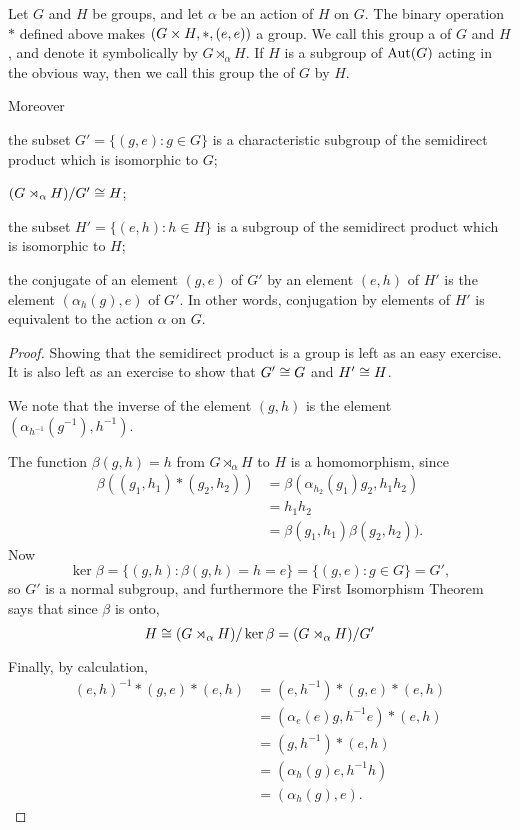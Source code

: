 \begin{proposition}
  Let $G$ and $H$ be groups, and let $\alpha$ be an action of $H$ on $G$.
  The binary operation $\ast$ defined above makes $(G \times H,
  \ast, (e,e))$ a group.  We call this group a 
  of $G$ and $H$, and denote it symbolically by $G \rtimes_{\alpha} H$.
  If $H$ is a subgroup of $\operatorname{Aut}(G)$ acting in the obvious way, then we call
  this group the  of $G$ by $H$.
  
  Moreover
  \begin{theoremenum}
    \item the subset $G' = \{(g,e): g \in G\}$ is a characteristic
    subgroup of the semidirect product which is isomorphic to $G$;
    
    \item $(G \rtimes_{\alpha} H) / G' \cong H$;
    
    \item the subset $H' = \{(e,h) : h \in H\}$ is a subgroup of the semidirect
    product which is isomorphic to $H$;
    
    \item the conjugate of an element $(g,e)$ of $G'$ by an element $(e,h)$
    of $H'$ is the element $(\alpha_{h}(g), e)$ of $G'$.  In other words,
    conjugation by elements of $H'$ is equivalent to the action $\alpha$ on $G$.
  \end{theoremenum}
\end{proposition}
\begin{proof}
  Showing that the semidirect product is a group is left as an easy exercise.
  It is also left as an exercise to show that $G' \cong G$ and $H' \cong H$.
    
  We note that the inverse of the element $(g,h)$ is the element
  $(\alpha_{h^{-1}}(g^{-1}), h^{-1})$.
  
  The function $\beta(g,h) = h$ from $G \rtimes_{\alpha} H$ to $H$ is a
  homomorphism, since
  \begin{align*}
    \beta((g_{1}, h_{1}) \ast (g_{2}, h_{2})) &= \beta(\alpha_{h_{2}}(g_{1})g_{2}, h_{1}h_{2}) \\
    &= h_{1}h_{2}\\
    &= \beta(g_{1}, h_{1})\beta(g_{2}, h_{2})).
  \end{align*}
  Now
  \[
    \ker \beta = \{ (g, h) : \beta(g,h) = h = e\} = \{ (g,e) : g \in G \} = G',
  \]
  so $G'$ is a normal subgroup, and furthermore the
  First Isomorphism Theorem says that since $\beta$ is onto,
  \[
    H \cong (G \rtimes_{\alpha} H)/\ker \beta = (G \rtimes_{\alpha} H)/G'
  \]
  
  Finally, by calculation,
  \begin{align*}
    (e,h)^{-1} \ast (g, e) \ast (e,h) &= (e,h^{-1}) \ast (g, e) \ast (e,h) \\
    &= (\alpha_{e}(e)g, h^{-1}e) \ast (e,h) \\
    &= (g, h^{-1}) \ast (e,h) \\
    &= (\alpha_{h}(g)e, h^{-1}h) \\
    &= (\alpha_{h}(g), e).
  \end{align*}
\end{proof}

